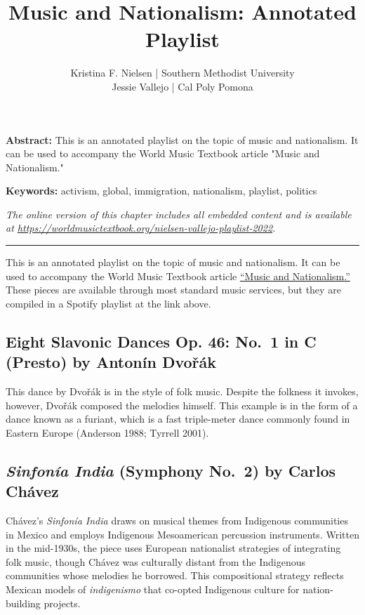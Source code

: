 \documentclass[twoside]{article}
\title{Music and Nationalism: Annotated Playlist}
\author{Kristina F. Nielsen | Southern Methodist University\\Jessie Vallejo | Cal Poly Pomona}
\date{}
\makeatletter
\renewcommand{\maketitle}{\bgroup\setlength{\parindent}{0pt}
\begin{flushleft}
  \vspace*{3\baselineskip}
  \huge{\textbf{\@title}}

  \medskip
  
  \large{\@author}
\end{flushleft}\egroup
}
\providecommand{\abstracttext}[1]
{
  \noindent
  \textbf{Abstract:} #1
}
\providecommand{\keywords}[1]
{
  \newline
  \textbf{Keywords:} #1
}
\providecommand{\wmturl}{\href{https://worldmusictextbook.org/nielsen-vallejo-playlist-2022}{https://worldmusictextbook.org/nielsen-vallejo-playlist-2022}}
\providecommand{\wmturltext}{
  \noindent\emph{The online version of this chapter includes all embedded content and is available at \wmturl.}
}
\makeatother
\begin{document}
\suppressfloats %
\maketitle

\abstracttext{This is an annotated playlist on the topic of music and nationalism. It can be used to accompany the World Music Textbook article "Music and Nationalism."}
\keywords{activism, global, immigration, nationalism, playlist, politics}

\smallskip

\wmturltext

\medskip

\noindent\hfil\rule{0.5\textwidth}{0.4pt}\hfil

\bigskip

\noindent
This is an annotated playlist on the topic of music and nationalism. It
can be used to accompany the World Music Textbook article
\href{https://worldmusictextbook.org/nielsen-vallejo-2022}{``Music and Nationalism.''} These
pieces are available through most standard music services, but they are
compiled in a Spotify playlist at the link above.

\hypertarget{eight-slavonic-dances-op.-46-no.-1-in-c-presto-by-antonuxedn-dvoux159uxe1k}{%
\subsection*{Eight Slavonic Dances Op. 46: No.~1 in C (Presto) by
Antonín
Dvořák}\label{eight-slavonic-dances-op.-46-no.-1-in-c-presto-by-antonuxedn-dvoux159uxe1k}}

This dance by Dvořák is in the style of folk music. Despite the folkness
it invokes, however, Dvořák composed the melodies himself. This example
is in the form of a dance known as a furiant, which is a fast
triple-meter dance commonly found in Eastern Europe (Anderson 1988;
Tyrrell 2001).~

\hypertarget{sinfonuxeda-india-symphony-no.-2-by-carlos-chuxe1vez}{%
\subsection*{\texorpdfstring{\emph{Sinfonía India} (Symphony No.~2) by
Carlos
Chávez}{Sinfonía India (Symphony No.~2) by Carlos Chávez}}\label{sinfonuxeda-india-symphony-no.-2-by-carlos-chuxe1vez}}

Chávez's \emph{Sinfonía India} draws on musical themes from Indigenous
communities in Mexico and employs Indigenous Mesoamerican percussion
instruments. Written in the mid-1930s, the piece uses European
nationalist strategies of integrating folk music, though Chávez was
culturally distant from the Indigenous communities whose melodies he
borrowed. This compositional strategy reflects Mexican models of
\emph{indigenismo} that co-opted Indigenous culture for nation-building
projects.~~
\end{document}
